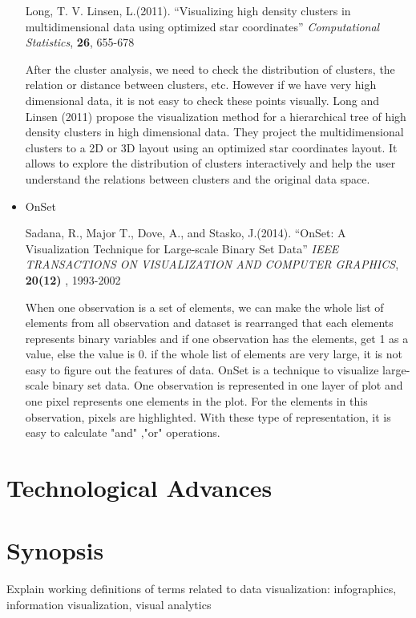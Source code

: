 \documentclass{article}
\begin{document}
\begin{itemize}
Long, T. V. Linsen, L.(2011).
``Visualizing high density clusters in multidimensional
data using optimized star coordinates''
{\em Computational Statistics}, {\bf 26}, 655-678

After the cluster analysis, we need to check the distribution of clusters, the relation or distance between clusters, etc. However if we have very high dimensional data, it is not easy to check these points visually. Long and Linsen (2011) propose the visualization method for a hierarchical tree of high density clusters in high dimensional data. They project the multidimensional clusters to a 2D or 3D layout using an optimized star coordinates layout. It allows to explore the distribution of clusters interactively and help the user understand the relations between clusters and the original data space.

\item OnSet

Sadana, R., Major T., Dove, A., and Stasko, J.(2014).
``OnSet: A Visualization Technique for Large-scale Binary Set Data''
{\em IEEE TRANSACTIONS ON VISUALIZATION AND COMPUTER GRAPHICS}, {\bf 20(12)} , 1993-2002

When one observation is a set of elements, we can make the whole list of elements from all observation and dataset is rearranged that each elements represents binary variables and if one observation has the elements, get 1 as a value, else the value is 0. if the whole list of elements are very large, it is not easy to figure out the features of data.
OnSet is a technique to visualize large-scale binary set data. One observation is represented in one layer of plot and one pixel represents one elements in the plot. For the elements in this observation, pixels are highlighted. With these type of representation, it is easy to calculate "and" ,"or" operations.


\end{itemize}

\section{Technological Advances}

\section{Synopsis}

Explain working definitions of terms related to data visualization: infographics, information visualization, visual analytics
\end{document}
